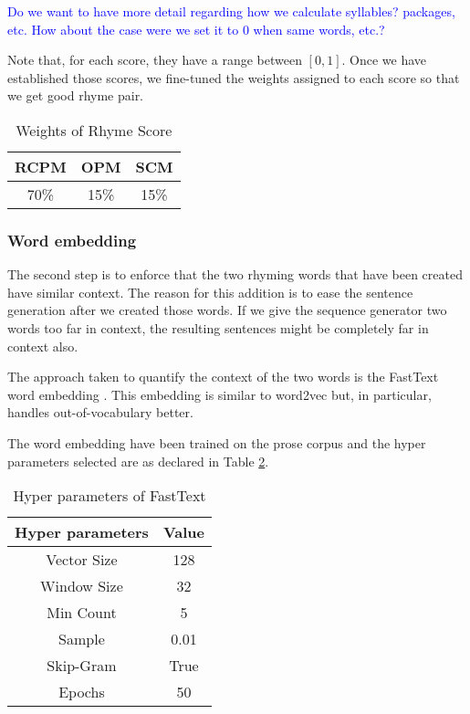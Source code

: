 \documentclass[11pt,a4paper]{article}
\begin{document}
\textcolor{blue}{
Do we want to have more detail regarding how we calculate syllables? packages, etc. How about the case were we set it to 0 when same words, etc.?
}

Note that, for each score, they have a range between $[ 0, 1]$. Once we have established those scores, we fine-tuned the weights assigned to each score so that we get good rhyme pair.
\begin{table}[ht]
\centering
\begin{tabular}{c c c}
	\hline\hline
	RCPM & OPM & SCM \\ [0.5ex]
	\hline
	70\% & 15\% & 15\% \\ [0.5ex]
	\hline
\end{tabular}
\caption{Weights of Rhyme Score}
\label{table:weight_rhyme_score}
\end{table}

\subsubsection{Word embedding}
\label{sec:fasttext}
The second step is to enforce that the two rhyming words that have been created have similar context. The reason for this addition is to ease the sentence generation after we created those words. If we give the sequence generator two words too far in context, the resulting sentences might be completely far in context also. 

The approach taken to quantify the context of the two words is the FastText word embedding \cite{fasttext}. This embedding is similar to word2vec \cite{wordvec} but, in particular, handles out-of-vocabulary better.

The word embedding have been trained on the prose corpus and the hyper parameters selected are as declared in Table \ref{table:HP_fasttext}.
\begin{table}[ht]
\centering
\begin{tabular}{c c}
	\hline\hline
	Hyper parameters & Value \\ [0.5ex]
	\hline
	Vector Size & 128 \\ [0.5ex]
	Window Size & 32 \\ [0.5ex]
	Min Count & 5 \\ [0.5ex]
	Sample & 0.01\\ [0.5ex]
	Skip-Gram & True\\ [0.5ex]
	Epochs  & 50\\ [0.5ex]
	\hline
\end{tabular}
\caption{Hyper parameters of FastText}
\label{table:HP_fasttext}
\end{table}
\end{document}
